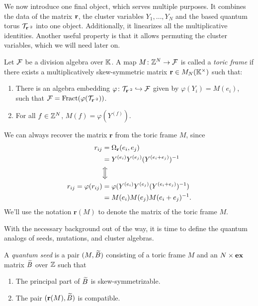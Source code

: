 We now introduce one final object, which serves multiple purposes. It combines the data
of the matrix $\mathbf{r}$, the cluster variables $Y_1, \dots, Y_N$ and the based quantum
torus $\mathcal{T}_{\mathbf{r}^{\cdot 2}}$ into one object. Additionally, it linearizes all the
multiplicative identities. Another useful property is that it allows permuting the
cluster variables, which we will need later on.
\begin{definition}
	Let $\mathcal{F}$ be a division algebra over $\mathbb{K}$. A map $M \colon \mathbb{Z}^N \to \mathcal{F}$ is called a \emph{toric frame} if there exists
	a multiplicatively skew-symmetric matrix $\mathbf{r} \in M_N(\mathbb{K}^\times)$ such that:
	\begin{enumerate}
		\item There is an algebra embedding $\varphi \colon \mathcal{T}_{\mathbf{r}^{\cdot 2}} \hookrightarrow \mathcal{F}$
		      given by $\varphi(Y_i) = M(e_i)$, such that $\mathcal{F} =
			      \operatorname{Fract}(\varphi(\mathcal{T}_{\mathbf{r}^{\cdot 2}}))$.
		\item For all $f \in \mathbb{Z}^N$, $M(f) = \varphi(Y^{(f)})$.
	\end{enumerate}
\end{definition}
\begin{remark}
	We can always recover the matrix $\mathbf{r}$ from the toric frame $M$,
	since
	\begin{align*}
		r_{ij}
		                         & = \Omega_{\mathbf{r}}(e_i, e_j)                    \\
		                         & = Y^{(e_i)}Y^{(e_j)}(Y^{(e_i + e_j)})^{-1}          \\
		                         & \Big\Updownarrow                                   \\
		r_{ij} = \varphi(r_{ij}) & = \varphi(Y^{(e_i)}Y^{(e_j)}(Y^{(e_i + e_j)})^{-1}) \\
		                         & = M(e_i)M(e_j)M(e_i + e_j)^{-1}.
	\end{align*}
	We'll use the notation $\mathbf{r}(M)$ to denote the matrix of the toric frame $M$.
\end{remark}
%
With the necessary background out of the way, it is time to define the quantum analogs
of seeds, mutations, and cluster algebras.
\begin{definition}
	A \emph{quantum seed} is a pair $(M, \widetilde{B})$ consisting of a toric frame $M$
	and an $N \times \mathbf{ex}$ matrix $\widetilde{B}$ over $\mathbb{Z}$ such that
	\begin{enumerate}
		\item The principal part of $\widetilde{B}$ is skew-symmetrizable.
		\item The pair $(\mathbf{r}(M), \widetilde{B})$ is compatible.
	\end{enumerate}
\end{definition}
